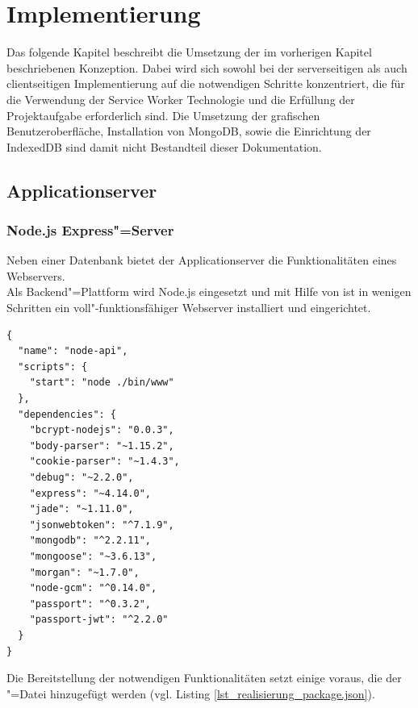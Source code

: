 \chapter{Implementierung}

Das folgende Kapitel beschreibt die Umsetzung der im vorherigen Kapitel beschriebenen Konzeption. Dabei wird sich sowohl bei der serverseitigen als auch clientseitigen Implementierung auf die notwendigen Schritte konzentriert, die für die Verwendung der Service Worker Technologie und die Erfüllung der Projektaufgabe erforderlich sind. Die Umsetzung der grafischen Benutzeroberfläche, Installation von MongoDB, sowie die Einrichtung der IndexedDB sind damit nicht Bestandteil dieser Dokumentation.

\section{Applicationserver}

\subsection{Node.js Express"=Server}
\label{subsec_implementierung_applicationserver}

Neben einer Datenbank bietet der Applicationserver die Funktionalitäten eines Webservers. \\
Als Backend"=Plattform wird Node.js eingesetzt und mit Hilfe von  ist in wenigen Schritten ein voll"-funktionsfähiger Webserver installiert und eingerichtet. \\

\begin{lstlisting}[caption={package.json - notwendige Node.js Pakete},label={lst_realisierung_package.json}, frame=single]
{
  "name": "node-api",
  "scripts": {
    "start": "node ./bin/www"
  },
  "dependencies": {
    "bcrypt-nodejs": "0.0.3",
    "body-parser": "~1.15.2",
    "cookie-parser": "~1.4.3",
    "debug": "~2.2.0",
    "express": "~4.14.0",
    "jade": "~1.11.0",
    "jsonwebtoken": "^7.1.9",
    "mongodb": "^2.2.11",
    "mongoose": "~3.6.13",
    "morgan": "~1.7.0",
    "node-gcm": "^0.14.0",
    "passport": "^0.3.2",
    "passport-jwt": "^2.2.0"
  }
}
\end{lstlisting}


Die Bereitstellung der notwendigen Funktionalitäten setzt einige  voraus, die der "=Datei hinzugefügt werden (vgl. Listing \ref{lst_realisierung_package.json}). 

